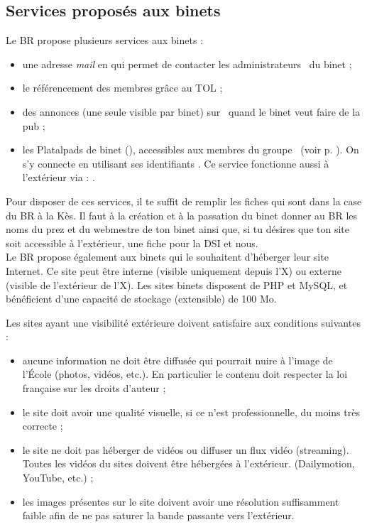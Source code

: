 \subsection{Services propos\'es aux binets}

Le BR propose plusieurs services aux binets :
\begin{itemize}
\item une adresse \emph{mail} en  qui permet de contacter les administrateurs \fkz\ du binet ;
\item le référencement des membres grâce au TOL ;
\item des annonces (une seule visible par binet) sur \fkz\ quand le binet veut faire de la pub ;
\item les Platalpads de binet (), accessibles aux membres du groupe \fkz\ (voir p. \pageref{platalpad}).
On s'y connecte en utilisant ses identifiants \fkz. Ce service fonctionne aussi \`a l'ext\'erieur via : \newline
{}.
\end{itemize}

Pour disposer de ces services, il te suffit de remplir les fiches qui sont dans la case du BR à la Kès. Il faut à la création et à la passation du binet
donner au BR les noms du prez et du webmestre de ton binet ainsi que, si tu désires que ton site soit accessible à l'extérieur, une fiche pour la DSI et nous.\\

\vspace{4mm}
Le BR propose également aux binets qui le souhaitent d'héberger leur site Internet. Ce site peut être interne (visible uniquement depuis l'X) ou externe (visible de l'extérieur de l'X).
Les sites binets disposent de PHP et MySQL, et bénéficient d'une capacité de stockage (extensible) de 100 Mo.

Les sites ayant une visibilité extérieure doivent satisfaire aux conditions suivantes :
\begin{itemize}
    \item aucune information ne doit être diffusée qui pourrait nuire à l'image de l’École (photos, vidéos, etc.). En particulier le contenu doit respecter la loi française sur les droits d'auteur ;
    \item le site doit avoir une qualité visuelle, si ce n'est professionnelle, du moins très correcte ;
    \item le site ne doit pas héberger de vidéos ou diffuser un flux vidéo (streaming). Toutes les vidéos du sites doivent être hébergées à l'extérieur. (Dailymotion, YouTube, etc.) ;
    \item les images présentes sur le site doivent avoir une résolution suffisamment faible afin de ne pas saturer la bande passante vers l'extérieur. 
\end{itemize}

